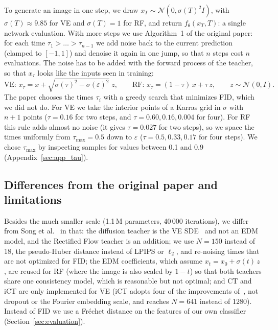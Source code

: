 \documentclass{article}
\begin{document}
To generate an image in one step, we draw $x_T \sim \mathcal{N}(0, \sigma(T)^2 I)$,
with $\sigma(T) \approx 9.85$ for VE and $\sigma(T) = 1$ for RF, and return
$f_\theta(x_T, T)$: a single network evaluation. With more steps we use
Algorithm~1 of the original paper: for each time
$\tau_1 > \dots > \tau_{n-1}$ we add noise back to the current prediction
(clamped to $[-1, 1]$) and denoise it again in one jump, so that $n$ steps
cost $n$ evaluations. The noise has to be added with the forward process of
the teacher, so that $x_\tau$ looks like the inputs seen in training:
\begin{equation}
  \text{VE: } x_\tau = x + \sqrt{\sigma(\tau)^2 - \sigma(\varepsilon)^2}\; z,
  \qquad
  \text{RF: } x_\tau = (1 - \tau)\, x + \tau\, z,
  \qquad z \sim \mathcal{N}(0, I).
\end{equation}
The paper chooses the times $\tau_i$ with a greedy search that minimizes FID,
which we did not do. For VE we take the interior points of a Karras grid in
$\sigma$ with $n + 1$ points ($\tau = 0.16$ for two steps, and
$\tau = 0.60, 0.16, 0.004$ for four). For RF this rule adds almost no noise
(it gives $\tau = 0.027$ for two steps), so we space the times uniformly from
$\tau_\text{max} = 0.5$ down to $\varepsilon$ ($\tau = 0.5, 0.33, 0.17$ for
four steps). We chose $\tau_\text{max}$ by inspecting samples for values
between 0.1 and 0.9 (Appendix~\ref{sec:app_tau}).

\subsection{Differences from the original paper and limitations}
\label{sec:differences}

Besides the much smaller scale (1.1\,M parameters, 40\,000 iterations), we
differ from Song et al.~\cite{song2023consistency} in that: the diffusion
teacher is the VE SDE~\cite{song2021sde} and not an EDM model, and the
Rectified Flow teacher is an addition; we use $N = 150$ instead of 18, the
pseudo-Huber distance instead of LPIPS or $\ell_2$, and re-noising times that
are not optimized for FID; the EDM coefficients, which assume
$x_t = x_0 + \sigma(t)\, z$, are reused for RF (where the image is also scaled
by $1 - t$) so that both teachers share one consistency model, which is
reasonable but not optimal; and CT and iCT are only implemented for VE (iCT
adopts four of the improvements of~\cite{song2024improved}, not dropout or the
Fourier embedding scale, and reaches $N = 641$ instead of 1280). Instead of FID we use a Fréchet distance on the features of
our own classifier (Section~\ref{sec:evaluation}).
\end{document}

